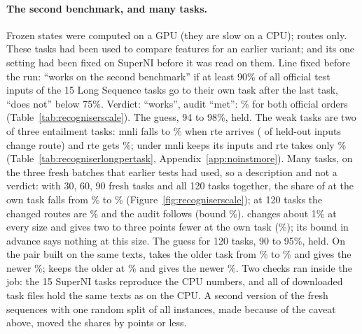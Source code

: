 \paragraph{The second benchmark, and many tasks.} Frozen states were computed on a GPU (they are slow on a CPU); routes only. These tasks had been used to compare features for an earlier variant; \recog{} and its one setting had been fixed on SuperNI before it was read on them.
Line fixed before the run: \recog{} ``works on the second benchmark'' if at least 90\% of all official test inputs of the 15 Long Sequence tasks go to their own task after the last task, ``does not'' below 75\%. Verdict: ``works'', audit ``met'': \AudScaleLongThreeEnd{}\% for both official orders (Table~\ref{tab:recogniserscale}). The guess, 94 to 98\%, held. The weak tasks are two of three entailment tasks: mnli falls to \AudScaleLongMnliEnd{}\% when rte arrives (\AudScaleLongMnliC{} of \AudScaleLongMnliM{} held-out inputs change route) and rte gets \AudScaleLongRteEnd{}\%; under \handicap{} mnli keeps its inputs and rte takes only \AudScaleLongRteHEnd{}\% (Table~\ref{tab:recogniserlongpertask}, Appendix~\ref{app:noinstmore}).
Many tasks, on the three fresh batches that earlier tests had used, so a description and not a verdict: with 30, 60, 90 fresh tasks and all 120 tasks together, the share of \recog{} at the own task falls from \AudScaleFreshThirtyEnd{}\% to \AudScaleAllHundredTwentyEnd{}\% (Figure~\ref{fig:recogniserscale}); at 120 tasks the changed routes are \AudScaleAllHundredTwentyChanged{}\% and the audit follows (bound \AudScaleAllHundredTwentyAuditBound{}\%). \handicap{} changes about 1\% at every size and gives two to three points fewer at the own task (\AudScaleAllHundredTwentyHEnd{}\%); its bound in advance says nothing at this size. The guess for 120 tasks, 90 to 95\%, held.
On the pair built on the same texts, \recog{} takes the older task from \AudScalePairOlderLArrival{}\% to \AudScalePairOlderLEnd{}\% and gives the newer \AudScalePairNewerLEnd{}\%; \handicap{} keeps the older at \AudScalePairOlderHEnd{}\% and gives the newer \AudScalePairNewerHEnd{}\%.
Two checks ran inside the job: the 15 SuperNI tasks reproduce the CPU numbers, and all \AudScaleFingerprintMatch{} of \AudScaleFingerprintTotal{} downloaded task files hold the same texts as on the CPU. A second version of the fresh sequences with one random split of all instances, made because of the caveat above, moved the shares by \AudScaleSplitMaxDiffEnd{} points or less.

\begin{table}[t]
  \caption{\recog{} and \handicap{} ($\nu = 2$) on the two benchmarks and on growing collections of tasks (frozen T5-base states on a GPU, routes only); means over tasks, in \%. Long Sequence rows: all official test inputs, read against a line fixed in advance; fresh-task rows: batches earlier tests had seen, a description. Audit $H/m$ and 95\% bound: Proposition~\ref{prop:audit}.}
  \label{tab:recogniserscale}
  \centering
  
\end{table}

